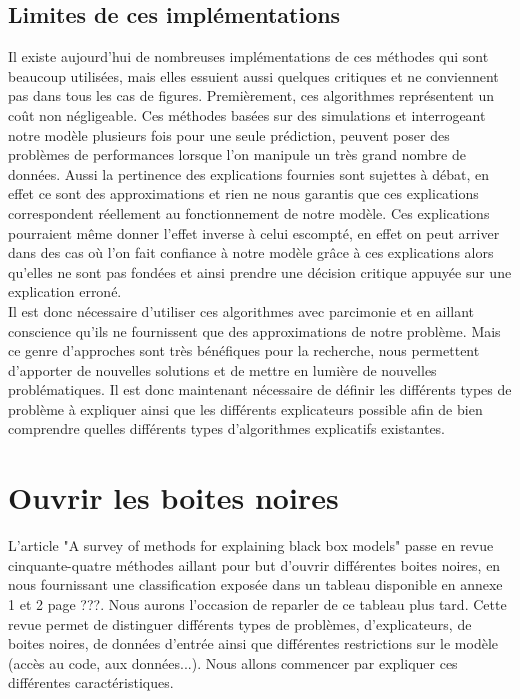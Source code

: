 \subsection{Limites de ces implémentations}
Il existe aujourd'hui de nombreuses implémentations de ces méthodes qui sont beaucoup utilisées, mais elles essuient aussi quelques critiques et ne conviennent pas dans tous les cas de figures. Premièrement, ces algorithmes représentent un coût non négligeable. Ces méthodes basées sur des simulations et interrogeant notre modèle plusieurs fois pour une seule prédiction, peuvent poser des problèmes de performances lorsque l'on manipule un très grand nombre de données. Aussi la pertinence des explications fournies sont sujettes à débat, en effet ce sont des approximations et rien ne nous garantis que ces explications correspondent réellement au fonctionnement de notre modèle. Ces explications pourraient même donner l'effet inverse à celui escompté, en effet on peut arriver dans des cas où l'on fait confiance à notre modèle grâce à ces explications alors qu'elles ne sont pas fondées et ainsi prendre une décision critique appuyée sur une explication erroné.\\

Il est donc nécessaire d'utiliser ces algorithmes avec parcimonie et en aillant conscience qu'ils ne fournissent que des approximations de notre problème. Mais ce genre d'approches sont très bénéfiques pour la recherche, nous permettent d'apporter de nouvelles solutions et de mettre en lumière de nouvelles problématiques. Il est donc maintenant nécessaire de définir les différents types de problème à expliquer ainsi que les différents explicateurs possible afin de bien comprendre quelles différents types d'algorithmes explicatifs existantes.

\section{Ouvrir les boites noires}
L'article "A survey of methods for explaining black box models"\cite{surveyExplaining} passe en revue cinquante-quatre méthodes aillant pour but d'ouvrir différentes boites noires, en nous fournissant une classification exposée dans un tableau disponible en annexe 1 et 2 page ???. Nous aurons l'occasion de reparler de ce tableau plus tard. Cette revue permet de distinguer différents types de problèmes, d'explicateurs, de boites noires, de données d'entrée ainsi que différentes restrictions sur le modèle (accès au code, aux données...). Nous allons commencer par expliquer ces différentes caractéristiques.

